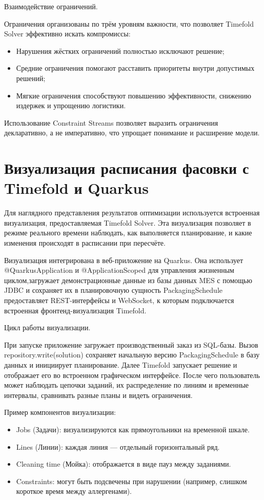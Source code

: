  Взаимодействие ограничений.

Ограничения организованы по трём уровням важности, что позволяет Timefold Solver эффективно искать компромиссы:

\begin{itemize}
    \item Нарушения жёстких ограничений полностью исключают решение;
    \item Средние ограничения помогают расставить приоритеты внутри допустимых решений;
    \item Мягкие ограничения способствуют повышению эффективности, снижению издержек и упрощению логистики.
\end{itemize}

Использование Constraint Streams позволяет выразить ограничения декларативно, а не императивно, что упрощает понимание и расширение модели.
\section{Визуализация расписания фасовки с Timefold и Quarkus}

Для наглядного представления результатов оптимизации используется встроенная визуализация, предоставляемая Timefold Solver. Эта визуализация позволяет в режиме реального времени наблюдать, как выполняется планирование, и какие изменения происходят в расписании при пересчёте.

Визуализация интегрирована в веб-приложение на Quarkus. Она использует @QuarkusApplication и @ApplicationScoped для управления жизненным циклом,загружает демонстрационные данные из базы данных MES с помощью JDBC и сохраняет их в планировочную сущность PackagingSchedule предоставляет REST-интерфейсы и WebSocket, к которым подключается встроенная фронтенд-визуализация Timefold.

Цикл работы визуализации.

При запуске приложение загружает производственный заказ из SQL-базы. Вызов repository.write(solution) сохраняет начальную версию PackagingSchedule в базу данных и инициирует планирование. Далее Timefold запускает решение и отображает его во встроенном графическом интерфейсе. После чего пользователь может наблюдать цепочки заданий, их распределение по линиям и временные интервалы, сравнивать разные планы и видеть ограничения.

 Пример компонентов визуализации:

 \begin{itemize}
    \item Jobs (Задачи): визуализируются как прямоугольники на временной шкале.
    \item Lines (Линии): каждая линия — отдельный горизонтальный ряд.
    \item Cleaning time (Мойка): отображается в виде пауз между заданиями.
    \item Constraints: могут быть подсвечены при нарушении (например, слишком короткое время между аллергенами).
 \end{itemize}

